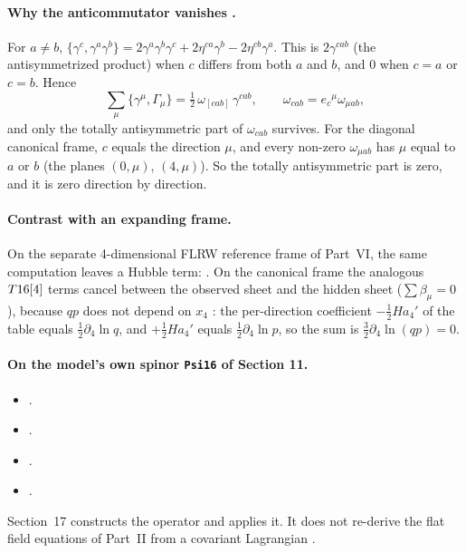 \paragraph{Why the anticommutator vanishes \cfderived.} For $a\neq b$,
$\{\gamma^c,\gamma^a\gamma^b\}=2\gamma^a\gamma^b\gamma^c+2\eta^{ca}\gamma^b-2\eta^{cb}\gamma^a$.
This is $2\gamma^{cab}$ (the antisymmetrized product) when $c$ differs from both $a$ and $b$, and
$0$ when $c=a$ or $c=b$. Hence
\begin{equation}\label{csc:eq:antisym}
  \sum_\mu\{\gamma^\mu,\Gamma_\mu\}=\tfrac12\,\omega_{[cab]}\,\gamma^{cab},\qquad \omega_{cab}=e_c{}^\mu\omega_{\mu ab},
\end{equation}
and only the totally antisymmetric part of $\omega_{cab}$ survives. For the diagonal canonical
frame, $c$ equals the direction $\mu$, and every non-zero $\omega_{\mu ab}$ has $\mu$ equal to $a$
or $b$ (the planes $(0,\mu)$, $(4,\mu)$). So the totally antisymmetric part is zero, and it is zero
direction by direction.

\paragraph{Contrast with an expanding frame.} On the separate 4-dimensional FLRW reference frame of
Part~VI, the same computation leaves a Hubble term: 
.
On the canonical frame the analogous $T16[4]$ terms cancel between the observed sheet and the
hidden sheet ($\sum\beta_\mu=0$), because $qp$ does not depend on $x_4$ \cfderived: the
per-direction coefficient $-\tfrac12Ha_4'$ of the table equals $\tfrac12\partial_4\ln q$, and
$+\tfrac12Ha_4'$ equals $\tfrac12\partial_4\ln p$, so the sum is $\tfrac32\partial_4\ln(qp)=0$.

\paragraph{On the model's own spinor \texttt{Psi16} of Section 11.}
\begin{itemize}
  \item {} .
  \item {} .
  \item {} .
  \item {} .
\end{itemize}
Section~17 constructs the operator and applies it. It does not re-derive the flat field equations
of Part~II from a covariant Lagrangian .


